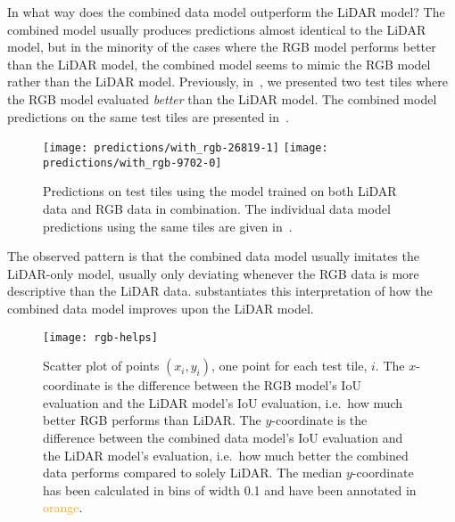 In what way does the combined data model outperform the LiDAR model?
The combined model usually produces predictions almost identical to the LiDAR model, but in the minority of the cases where the RGB model performs better than the LiDAR model, the combined model seems to mimic the RGB model rather than the LiDAR model.
Previously, in~, we presented two test tiles where the RGB model evaluated \emph{better} than the LiDAR model.
The combined model predictions on the same test tiles are presented in~.

\begin{figure}[H]
  \centering
  \texttt{[image: predictions/with\_rgb-26819-1]}  %
  \textcolor{gray}{\vrule}
  \texttt{[image: predictions/with\_rgb-9702-0]}  %
  \caption{%
    Predictions on test tiles using the model trained on both LiDAR data and RGB data in combination.
    The individual data model predictions using the same tiles are given in~.
  }%
  \label{fig:rgb-selection}
\end{figure}

The observed pattern is that the combined data model usually imitates the LiDAR-only model, usually only deviating whenever the RGB data is more descriptive than the LiDAR data.
 substantiates this interpretation of how the combined data model improves upon the LiDAR model.

\begin{figure}[H]
  \centering
  \texttt{[image: rgb-helps]}
  \caption{%
    Scatter plot of points $(x_i, y_i)$, one point for each test tile, $i$.
    The $x$-coordinate is the difference between the RGB model's IoU evaluation and the LiDAR model's IoU evaluation, i.e.\ how much better RGB performs than LiDAR.
    The $y$-coordinate is the difference between the combined data model's IoU evaluation and the LiDAR model's evaluation, i.e.\ how much better the combined data performs compared to solely LiDAR.
    The median $y$-coordinate has been calculated in bins of width \num{0.1} and have been annotated in \textcolor{orange}{orange}.
  }%
  \label{fig:rgb-help}
\end{figure}


